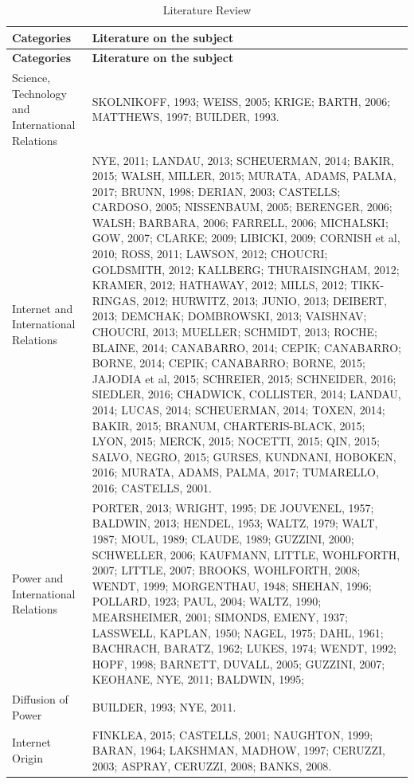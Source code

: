 \begin{longtable}[c]{|p{4cm}|p{11cm}|}
    \caption{Literature Review} \\
    \hline
    \textbf{Categories} & \textbf{Literature on the subject} \\
    \hline
    \endfirsthead
    \hline
    \textbf{Categories} & \textbf{Literature on the subject} \\
    \hline
    \endhead
    \hline
    \endfoot
    \hline
    \endlastfoot
    Science, Technology and International Relations & SKOLNIKOFF, 1993; WEISS, 2005; KRIGE; BARTH, 2006; MATTHEWS, 1997; BUILDER, 1993. \\
    \hline
    Internet and International Relations & NYE, 2011; LANDAU, 2013; SCHEUERMAN, 2014; BAKIR, 2015; WALSH, MILLER, 2015; MURATA, ADAMS, PALMA, 2017; BRUNN, 1998; DERIAN, 2003; CASTELLS; CARDOSO, 2005; NISSENBAUM, 2005; BERENGER, 2006; WALSH; BARBARA, 2006; FARRELL, 2006; MICHALSKI; GOW, 2007; CLARKE; 2009; LIBICKI, 2009; CORNISH et al, 2010; ROSS, 2011; LAWSON, 2012; CHOUCRI; GOLDSMITH, 2012; KALLBERG; THURAISINGHAM, 2012; KRAMER, 2012; HATHAWAY, 2012; MILLS, 2012; TIKK-RINGAS, 2012; HURWITZ, 2013; JUNIO, 2013; DEIBERT, 2013; DEMCHAK; DOMBROWSKI, 2013; VAISHNAV; CHOUCRI, 2013; MUELLER; SCHMIDT, 2013; ROCHE; BLAINE, 2014; CANABARRO, 2014; CEPIK; CANABARRO; BORNE, 2014; CEPIK; CANABARRO; BORNE, 2015; JAJODIA et al, 2015; SCHREIER, 2015; SCHNEIDER, 2016; SIEDLER, 2016; CHADWICK, COLLISTER, 2014; LANDAU, 2014; LUCAS, 2014; SCHEUERMAN, 2014; TOXEN, 2014; BAKIR, 2015; BRANUM, CHARTERIS-BLACK, 2015; LYON, 2015; MERCK, 2015; NOCETTI, 2015; QIN, 2015; SALVO, NEGRO, 2015; GURSES, KUNDNANI, HOBOKEN, 2016; MURATA, ADAMS, PALMA, 2017; TUMARELLO, 2016; CASTELLS, 2001. \\
    \hline
    Power and International Relations & PORTER, 2013; WRIGHT, 1995; DE JOUVENEL, 1957; BALDWIN, 2013; HENDEL, 1953; WALTZ, 1979; WALT, 1987; MOUL, 1989; CLAUDE, 1989; GUZZINI, 2000; SCHWELLER, 2006; KAUFMANN, LITTLE, WOHLFORTH, 2007; LITTLE, 2007; BROOKS, WOHLFORTH, 2008; WENDT, 1999; MORGENTHAU, 1948; SHEHAN, 1996; POLLARD, 1923; PAUL, 2004; WALTZ, 1990; MEARSHEIMER, 2001; SIMONDS, EMENY, 1937; LASSWELL, KAPLAN, 1950; NAGEL, 1975; DAHL, 1961; BACHRACH, BARATZ, 1962; LUKES, 1974; WENDT, 1992; HOPF, 1998; BARNETT, DUVALL, 2005; GUZZINI, 2007; KEOHANE, NYE, 2011; BALDWIN, 1995; \\
    \hline
    Diffusion of Power & BUILDER, 1993; NYE, 2011. \\
    \hline
    Internet Origin & FINKLEA, 2015; CASTELLS, 2001; NAUGHTON, 1999; BARAN, 1964; LAKSHMAN, MADHOW, 1997; CERUZZI, 2003; ASPRAY, CERUZZI, 2008; BANKS, 2008. \\

\end{longtable}
